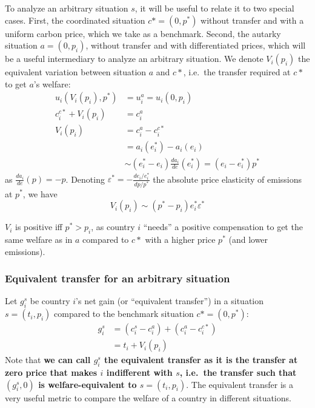 \documentclass[12pt,english]{article}
\begin{document}
To analyze an arbitrary situation $s$, it will be useful to relate it to two special cases. First, the coordinated situation $c*=(0,p^*)$ without transfer and with a uniform carbon price, which we take as a benchmark. Second, the autarky situation $a=(0, p_i)$, without transfer and with differentiated prices, which will be a useful intermediary to analyze an arbitrary situation. We denote $V_i(p_i)$ the equivalent variation between situation $a$ and $c*$, i.e.~the transfer required at $c*$ to get $a$'s welfare: 
$$\begin{aligned}
u_i(V_i(p_i), p^*)&=u^a_i=u_i(0, p_i) \\
c^{c*}_i + V_i(p_i) &= c^a_i \\
V_i(p_i) &= c^a_i - c^{c*}_i \\
&= a_i(e^*_i ) - a_i(e_i) \\
 &\sim  (e^*_i  - e_i) \frac{da_i}{de} (e^*_i ) = (e_i - e^*_i ) p^* 
\end{aligned}$$
as $\frac{da_i}{de} (p) = -p$.
Denoting $\varepsilon^* = -\frac{de_i/e^*_i }{dp/p^*}$ the absolute price elasticity of emissions at $p^*$, we have $$V_i(p_i) \sim (p^* - p_i) e^*_i  \varepsilon^* $$


$V_i$ is positive iff $p^* > p_i$, as country $i$ ``needs'' a positive compensation to get the same welfare as in $a$ compared to $c*$ with a higher price $p^*$ (and lower emissions).

\subsubsection*{Equivalent transfer for an arbitrary
situation}\label{equivalent-transfer-for-an-arbitrary-situation}

Let $g^s_i$ be country $i$'s net gain (or ``equivalent transfer'') in a situation $s=(t_i, p_i)$ compared to the benchmark situation $c*=(0,p^*)$: 
$$\begin{aligned}
g^s_i &= (c^s_i - c^a_i) + (c^a_i - c^{c*}_i) \\
 &= t_i + V_i(p_i)
\end{aligned}$$ 
Note that \textbf{we can call $g^s_i$ the equivalent transfer as it is the transfer at zero price that makes $i$ indifferent with $s$, i.e.~the transfer such that $(g^s_i, 0)$ is welfare-equivalent to $s=(t_i, p_i)$}. The equivalent transfer is a very useful metric to compare the welfare of a country in different situations.
\end{document}
